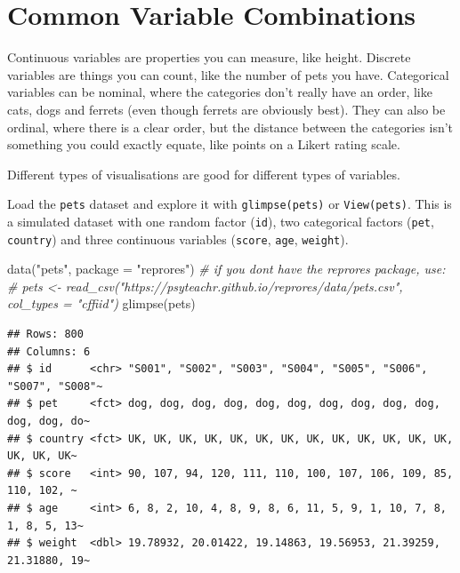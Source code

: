 \documentclass[
  oneside]{book}
\newenvironment{Shaded}{\begin{snugshade}}{\end{snugshade}}
\newcommand{\AttributeTok}[1]{\textcolor[rgb]{0.77,0.63,0.00}{#1}}
\newcommand{\CommentTok}[1]{\textcolor[rgb]{0.56,0.35,0.01}{\textit{#1}}}
\newcommand{\FunctionTok}[1]{\textcolor[rgb]{0.00,0.00,0.00}{#1}}
\newcommand{\NormalTok}[1]{#1}
\newcommand{\StringTok}[1]{\textcolor[rgb]{0.31,0.60,0.02}{#1}}
\begin{document}
\hypertarget{vartypes}{%
\section{Common Variable Combinations}\label{vartypes}}

Continuous variables are properties you can measure, like height. Discrete variables are things you can count, like the number of pets you have. Categorical variables can be nominal, where the categories don't really have an order, like cats, dogs and ferrets (even though ferrets are obviously best). They can also be ordinal, where there is a clear order, but the distance between the categories isn't something you could exactly equate, like points on a Likert rating scale.

Different types of visualisations are good for different types of variables.

Load the \texttt{pets} dataset and explore it with \texttt{glimpse(pets)} or \texttt{View(pets)}. This is a simulated dataset with one random factor (\texttt{id}), two categorical factors (\texttt{pet}, \texttt{country}) and three continuous variables (\texttt{score}, \texttt{age}, \texttt{weight}).

\begin{Shaded}
\begin{Highlighting}[]
\FunctionTok{data}\NormalTok{(}\StringTok{"pets"}\NormalTok{, }\AttributeTok{package =} \StringTok{"reprores"}\NormalTok{)}
\CommentTok{\# if you don\textquotesingle{}t have the reprores package, use:}
\CommentTok{\# pets \textless{}{-} read\_csv("https://psyteachr.github.io/reprores/data/pets.csv", col\_types = "cffiid")}
\FunctionTok{glimpse}\NormalTok{(pets)}
\end{Highlighting}
\end{Shaded}

\begin{verbatim}
## Rows: 800
## Columns: 6
## $ id      <chr> "S001", "S002", "S003", "S004", "S005", "S006", "S007", "S008"~
## $ pet     <fct> dog, dog, dog, dog, dog, dog, dog, dog, dog, dog, dog, dog, do~
## $ country <fct> UK, UK, UK, UK, UK, UK, UK, UK, UK, UK, UK, UK, UK, UK, UK, UK~
## $ score   <int> 90, 107, 94, 120, 111, 110, 100, 107, 106, 109, 85, 110, 102, ~
## $ age     <int> 6, 8, 2, 10, 4, 8, 9, 8, 6, 11, 5, 9, 1, 10, 7, 8, 1, 8, 5, 13~
## $ weight  <dbl> 19.78932, 20.01422, 19.14863, 19.56953, 21.39259, 21.31880, 19~
\end{verbatim}
\end{document}
